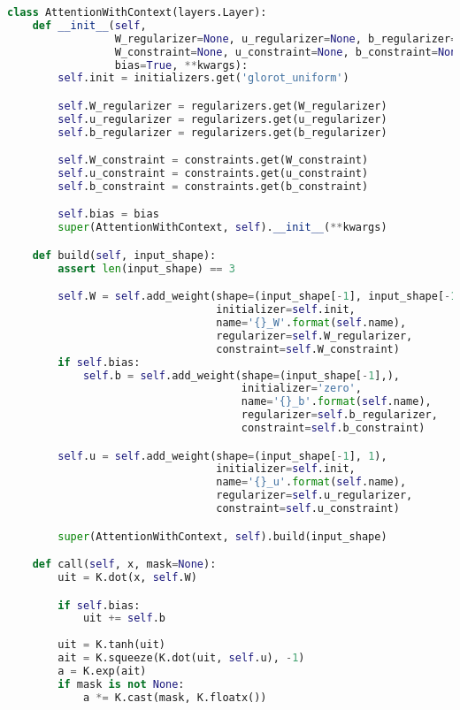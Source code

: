 \begin{lstlisting}[language=Python]
class AttentionWithContext(layers.Layer):
    def __init__(self,
                 W_regularizer=None, u_regularizer=None, b_regularizer=None,
                 W_constraint=None, u_constraint=None, b_constraint=None,
                 bias=True, **kwargs):
        self.init = initializers.get('glorot_uniform')

        self.W_regularizer = regularizers.get(W_regularizer)
        self.u_regularizer = regularizers.get(u_regularizer)
        self.b_regularizer = regularizers.get(b_regularizer)

        self.W_constraint = constraints.get(W_constraint)
        self.u_constraint = constraints.get(u_constraint)
        self.b_constraint = constraints.get(b_constraint)

        self.bias = bias
        super(AttentionWithContext, self).__init__(**kwargs)

    def build(self, input_shape):
        assert len(input_shape) == 3

        self.W = self.add_weight(shape=(input_shape[-1], input_shape[-1]),
                                 initializer=self.init,
                                 name='{}_W'.format(self.name),
                                 regularizer=self.W_regularizer,
                                 constraint=self.W_constraint)
        if self.bias:
            self.b = self.add_weight(shape=(input_shape[-1],),
                                     initializer='zero',
                                     name='{}_b'.format(self.name),
                                     regularizer=self.b_regularizer,
                                     constraint=self.b_constraint)

        self.u = self.add_weight(shape=(input_shape[-1], 1),
                                 initializer=self.init,
                                 name='{}_u'.format(self.name),
                                 regularizer=self.u_regularizer,
                                 constraint=self.u_constraint)

        super(AttentionWithContext, self).build(input_shape)

    def call(self, x, mask=None):
        uit = K.dot(x, self.W)

        if self.bias:
            uit += self.b
            
        uit = K.tanh(uit)
        ait = K.squeeze(K.dot(uit, self.u), -1)
        a = K.exp(ait)
        if mask is not None:
            a *= K.cast(mask, K.floatx())


\end{lstlisting}
